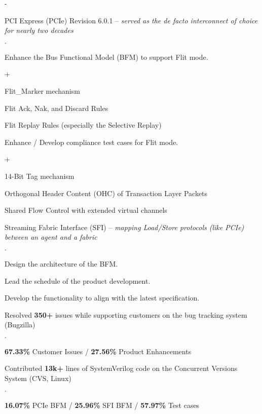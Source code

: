 \documentclass{cvclass}
\begin{document}
    \begin{plainitemize}{-}
        \item PCI Express\textsuperscript{\tiny\textregistered} (PCIe) Revision 6.0.1 -- \textit{served as the de facto interconnect of choice for nearly two decades}
        \begin{plainitemize}{\(\cdot\)}
            \item Enhance the Bus Functional Model (BFM) to support Flit mode.
            \begin{plainitemize}{+}
                \item Flit\_Marker mechanism
                \item Flit Ack, Nak, and Discard Rules
                \item Flit Replay Rules (especially the Selective Replay)
            \end{plainitemize}
            \item Enhance / Develop compliance test cases for Flit mode.
            \begin{plainitemize}{+}
                \item 14-Bit Tag mechanism
                \item Orthogonal Header Content (OHC) of Transaction Layer Packets
                \item Shared Flow Control with extended virtual channels
            \end{plainitemize}
        \end{plainitemize}
        \item Streaming Fabric Interface (SFI) -- \textit{mapping Load/Store protocols (like PCIe) between an agent and a fabric}
        \begin{plainitemize}{\(\cdot\)}
            \item Design the architecture of the BFM.
            \item Lead the schedule of the product development.
            \item Develop the functionality to align with the latest specification.
        \end{plainitemize}
        \item Resolved \textbf{350+} issues while supporting customers on the bug tracking system (Bugzilla)
        \begin{plainitemize}{\(\cdot\)}
            \item {\textbf{67.33\%} Customer Issues / \textbf{27.56\%} Product Enhancements}
        \end{plainitemize}
        \item Contributed \textbf{13k+} lines of SystemVerilog code on the Concurrent Versions System (CVS, Linux)
        \begin{plainitemize}{\(\cdot\)}
            \item \textbf{16.07\%} PCIe BFM / \textbf{25.96\%} SFI BFM / \textbf{57.97\%} Test cases
        \end{plainitemize}
    \end{plainitemize}
\end{document}
